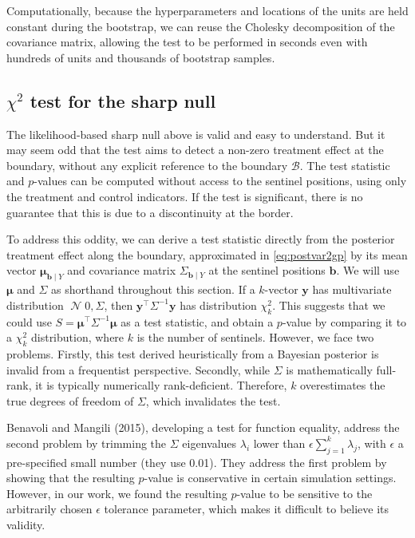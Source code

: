\documentclass[letter]{article}
\DeclareMathOperator{\normal}{\mathcal{N}}
\newcommand{\trans}{^{\intercal}}
\newcommand{\yvec}{\mathbold{y}}
\newcommand{\muvec}{\mathbold{\mu}}
\newcommand{\boundary}{\mathcal{B}}
\newcommand{\sentinels}{\bm{b}}
\begin{document}
Computationally, because the hyperparameters and locations of the units are held constant during the bootstrap, we can reuse the Cholesky decomposition of the covariance matrix, allowing the test to be performed in seconds even with hundreds of units and thousands of bootstrap samples.
    


    	\subsection{\texorpdfstring{\(\chi^2\) test for the sharp null}{\textbackslash{}chi\^{}2 test for the sharp null}}\label{chi2-test-for-the-sharp-null}

The likelihood-based sharp null above is valid and easy to understand.
But it may seem odd that the test aims to detect a non-zero treatment effect at the boundary, without any explicit reference to the boundary \(\boundary\). The test statistic and \(p\)-values can be computed without access to the sentinel positions, using only the treatment and control indicators. If the test is significant, there is no guarantee that this is due to a discontinuity at the border.

To address this oddity, we can derive a test statistic directly from the posterior treatment effect along the boundary,
approximated in \eqref{eq:postvar2gp} by its mean vector \(\muvec_{\sentinels \mid Y}\)
and covariance matrix \(\Sigma_{\sentinels \mid Y}\) at the sentinel positions \(\sentinels\).
We will use \(\muvec\) and \(\Sigma\) as shorthand throughout this section.
If a \(k\)-vector \(\yvec\) has multivariate distribution \(\normal{0, \Sigma}\), then \(\yvec\trans \Sigma^{-1} \yvec\) has distribution \(\chi^2_k\).
This suggests that we could use \(S=\muvec\trans \Sigma^{-1} \muvec\) as a test statistic,
and obtain a \(p\)-value by comparing it to a \(\chi^2_k\) distribution, where \(k\) is the number of sentinels.
However, we face two problems.
Firstly, this test derived heuristically from a Bayesian posterior is invalid from a frequentist perspective.
Secondly, while \(\Sigma\) is mathematically full-rank, it is typically numerically rank-deficient.
Therefore, \(k\) overestimates the true degrees of freedom of \(\Sigma\), which invalidates the test.

Benavoli and Mangili (2015), developing a test for function equality, address the second problem by trimming the \(\Sigma\) eigenvalues \(\lambda_i\) lower than \(\epsilon \sum_{j=1}^k \lambda_j\), with \(\epsilon\) a pre-specified small number (they use 0.01).
They address the first problem by showing that the resulting \(p\)-value is conservative in certain simulation settings.
However, in our work, we found the resulting \(p\)-value to be sensitive to the arbitrarily chosen \(\epsilon\) tolerance parameter, which makes it difficult to believe its validity.
\end{document}
